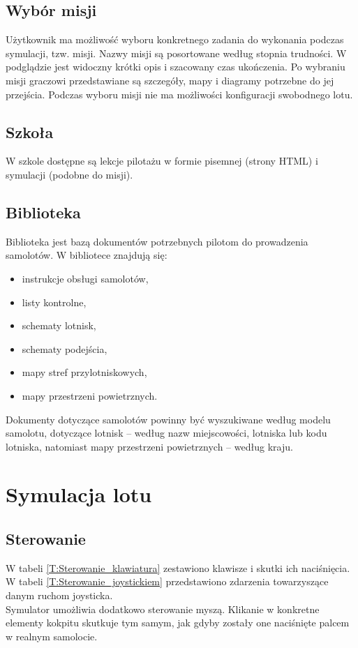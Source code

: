 \documentclass{mwrep}
\begin{document}
\subsection{Wybór misji}

Użytkownik ma możliwość wyboru konkretnego zadania do wykonania podczas symulacji, tzw. misji. Nazwy misji są posortowane według stopnia trudności. W podglądzie jest widoczny krótki opis i szacowany czas ukończenia. Po wybraniu misji graczowi przedstawiane są szczegóły, mapy i diagramy potrzebne do jej przejścia. Podczas wyboru misji nie ma możliwości konfiguracji swobodnego lotu.

\subsection{Szkoła}
W szkole dostępne są lekcje pilotażu w formie pisemnej (strony HTML) i symulacji (podobne do misji).

\subsection{Biblioteka}
Biblioteka jest bazą dokumentów potrzebnych pilotom do prowadzenia samolotów. W bibliotece znajdują się:
\begin{itemize}
\item instrukcje obsługi samolotów,
\item listy kontrolne,
\item schematy lotnisk,
\item schematy podejścia,
\item mapy stref przylotniskowych,
\item mapy przestrzeni powietrznych.
\end{itemize}

Dokumenty dotyczące samolotów powinny być wyszukiwane według modelu samolotu, dotyczące lotnisk -- według nazw miejscowości, lotniska lub kodu lotniska, natomiast mapy przestrzeni powietrznych -- według kraju.

\section{Symulacja lotu}

\subsection{Sterowanie}

W tabeli \ref{T:Sterowanie_klawiatura} zestawiono klawisze i skutki ich naciśnięcia. W tabeli \ref{T:Sterowanie_joystickiem} przedstawiono zdarzenia towarzyszące danym ruchom joysticka.\\
Symulator umożliwia dodatkowo sterowanie myszą. Klikanie w konkretne elementy kokpitu skutkuje tym samym, jak gdyby zostały one naciśnięte palcem w realnym samolocie.
\end{document}
